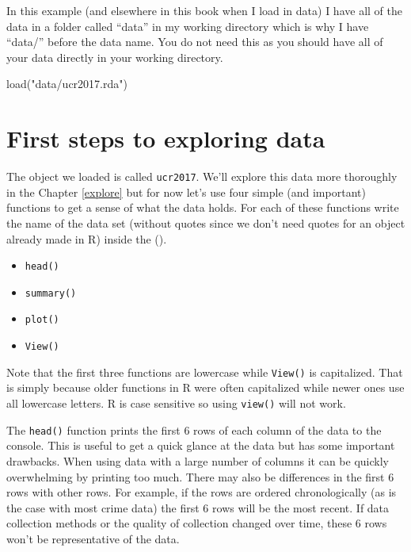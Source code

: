 \documentclass[
]{krantz}
\makeatletter
\newenvironment{Shaded}{\begin{snugshade}}{\end{snugshade}}
\newcommand{\FunctionTok}[1]{\textcolor[rgb]{0,0,0}{#1}}
\newcommand{\NormalTok}[1]{#1}
\newcommand{\StringTok}[1]{\textcolor[rgb]{0.5,0.5,0.5}{#1}}
\providecommand{\tightlist}{%
  \setlength{\itemsep}{0pt}\setlength{\parskip}{0pt}}
\newenvironment{kframe}{%
\medskip{}
\setlength{\fboxsep}{.8em}
 \def\at@end@of@kframe{}%
 \ifinner\ifhmode%
  \def\at@end@of@kframe{\end{minipage}}%
  \begin{minipage}{\columnwidth}%
 \fi\fi%
 \def\FrameCommand##1{\hskip\@totalleftmargin \hskip-\fboxsep
 \colorbox{shadecolor}{##1}\hskip-\fboxsep
     \hskip-\linewidth \hskip-\@totalleftmargin \hskip\columnwidth}%
 \MakeFramed {\advance\hsize-\width
   \@totalleftmargin\z@ \linewidth\hsize
   \@setminipage}}%
 {\par\unskip\endMakeFramed%
 \at@end@of@kframe}
\renewenvironment{Shaded}{\begin{kframe}}{\end{kframe}}
\makeatother
\begin{document}
In this example (and elsewhere in this book when I load in data) I have all of the data in a folder called ``data'' in my working directory which is why I have ``data/'' before the data name. You do not need this as you should have all of your data directly in your working directory.

\begin{Shaded}
\begin{Highlighting}[]
\FunctionTok{load}\NormalTok{(}\StringTok{"data/ucr2017.rda"}\NormalTok{)}
\end{Highlighting}
\end{Shaded}

\hypertarget{first-steps-to-exploring-data}{%
\section{First steps to exploring data}\label{first-steps-to-exploring-data}}

The object we loaded is called \texttt{ucr2017}. We'll explore this data more thoroughly in the Chapter \ref{explore} but for now let's use four simple (and important) functions to get a sense of what the data holds. For each of these functions write the name of the data set (without quotes since we don't need quotes for an object already made in R) inside the ().

\begin{itemize}
\tightlist
\item
  \texttt{head()}
\item
  \texttt{summary()}
\item
  \texttt{plot()}
\item
  \texttt{View()}
\end{itemize}

Note that the first three functions are lowercase while \texttt{View()} is capitalized. That is simply because older functions in R were often capitalized while newer ones use all lowercase letters. R is case sensitive so using \texttt{view()} will not work.

The \texttt{head()} function prints the first 6 rows of each column of the data to the console. This is useful to get a quick glance at the data but has some important drawbacks. When using data with a large number of columns it can be quickly overwhelming by printing too much. There may also be differences in the first 6 rows with other rows. For example, if the rows are ordered chronologically (as is the case with most crime data) the first 6 rows will be the most recent. If data collection methods or the quality of collection changed over time, these 6 rows won't be representative of the data.
\end{document}
